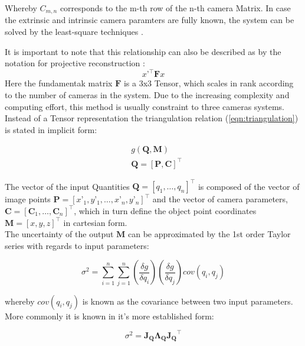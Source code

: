 \documentclass[5p,times,procedia]{elsarticle}
\begin{document}
Whereby $C_{m,n}$ corresponds to the m-th row of the n-th camera Matrix.
In case the extrinsic and intrinsic camera paramters are fully known, the system can be solved by the least-square techniques \cite{Ahn2004}.

It is important to note that this relationship can also be described as by the notation for projective reconstruction \cite{Hartley2018}:
\begin{equation}
	\label{eqn:ProjectiveReconstruction}
	x’^{\top}\mathbf{F}x
\end{equation}
Here the fundamentak matrix $\mathbf{F}$ is a 3x3 Tensor, which scales in rank according to the number of cameras in the system. Due to the increasing complexity and computing effort, this method is usually constraint to three cameras systems.\\
Instead of a Tensor representation the triangulation relation (\ref{eqn:triangulation}) is stated in implicit form:

\begin{equation}
	\label{eqn:ImplicitFrom}
	\begin{aligned}
		& g(\mathbf{Q},\mathbf{M}) \\
		& \mathbf{Q} = [\mathbf{P},\mathbf{C}]^{\top}
	\end{aligned}
\end{equation}

The vector of the input Quantities $\mathbf{Q} = \left[q_1,\dots, q_{n}\right]^{\top}$ is composed of the vector of image points $\mathbf{P} = [x’_1,y’_1, \dots ,x’_n,y’_n]^{\top}$ and the vector of camera parameters, $\mathbf{C} = \left[ \mathbf{C}_1 , \dots , \mathbf{C}_n \right]^{\top}$, which in turn define the object point coordinates $\mathbf{M} =  [x,y,z]^{\top}$ in cartesian form. \\
The uncertainty of the output $\mathbf{M}$ can be approximated by the 1st order Taylor series with regards to input parameters:

\begin{equation}
	\sigma^2 = \sum_{i=1}^{n}\sum_{j=1}^{n} \left(\frac{\delta g}{\delta q_i}\right) \left(\frac{\delta g}{\delta q_j}\right) cov(q_i, q_j) 
\end{equation}

whereby $cov(q_i, q_j) $ is known as the covariance between two input parameters. More commonly it is known in it’s more established \cite{Cox2006} form: 

\begin{equation}
	\sigma^2 = \mathbf{J_{Q}}\mathbf{\Lambda_{Q}}\mathbf{J_{Q}}^{\top}
\end{equation}
\end{document}
